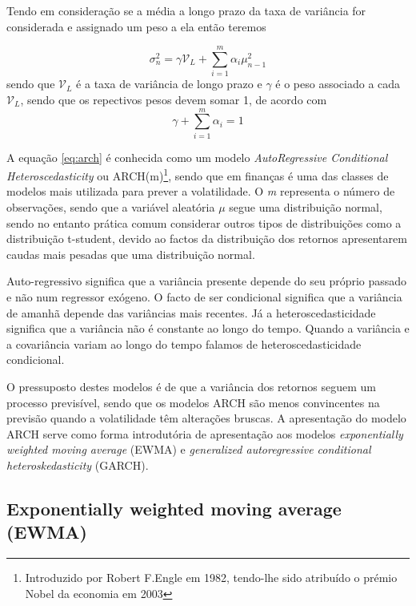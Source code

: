 \documentclass[
  12pt,
  a4paper,
  openany]{book}
\begin{document}
Tendo em consideração \citet{Hull2018} se a média a longo prazo da taxa de variância for considerada e assignado um peso a ela então teremos

\begin{equation} 
  \sigma_{n}^{2} =\gamma\mathcal{V}_{L}+\sum_{i=1}^{m}\alpha_i\mu_{n-1}^{2}
  \label{eq:arch}
\end{equation}
sendo que \(\mathcal{V}_{L}\) é a taxa de variância de longo prazo e \(\gamma\) é o peso associado a cada \(\mathcal{V}_{L}\), sendo que os repectivos pesos devem somar 1, de acordo com \[\gamma + \sum_{i=1}^{m}\alpha_i = 1\]

A equação \eqref{eq:arch} é conhecida como um modelo \emph{AutoRegressive Conditional Heteroscedasticity} ou ARCH(m)\footnote{Introduzido por Robert F.Engle em 1982, tendo-lhe sido atribuído o prémio Nobel da economia em 2003}, sendo que em finanças é uma das classes de modelos mais utilizada para prever a volatilidade. O \emph{m} representa o número de observações, sendo que a variável aleatória \(\mu\) segue uma distribuição normal, sendo no entanto prática comum considerar outros tipos de distribuições como a distribuição t-student, devido ao factos da distribuição dos retornos apresentarem caudas mais pesadas que uma distribuição normal.

Auto-regressivo significa que a variância presente depende do seu próprio passado e não num regressor exógeno. O facto de ser condicional significa que a variância de amanhã depende das variâncias mais recentes. Já a heteroscedasticidade significa que a variância não é constante ao longo do tempo. Quando a variância e a covariância variam ao longo do tempo falamos de heteroscedasticidade condicional.

O pressuposto destes modelos é de que a variância dos retornos seguem um processo previsível, sendo que os modelos ARCH são menos convincentes na previsão quando a volatilidade têm alterações bruscas. A apresentação do modelo ARCH serve como forma introdutória de apresentação aos modelos \emph{exponentially weighted moving average} (EWMA) e \emph{generalized autoregressive conditional heteroskedasticity} (GARCH).

\hypertarget{exponentially-weighted-moving-average-ewma}{%
\subsection{Exponentially weighted moving average (EWMA)}\label{exponentially-weighted-moving-average-ewma}}
\end{document}
